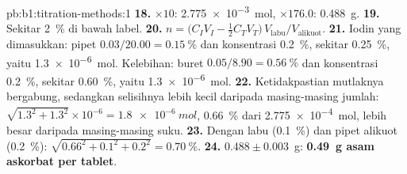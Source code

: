 \begin{solution}{pb:b1:titration-methods:1}
\textbf{18.} $\times 10$: \qty{2.775e-3}{mol}, $\times 176.0$:
\qty{0.488}{g}.
\textbf{19.} Sekitar \qty{2}{\percent} di bawah label.
\textbf{20.} $n = \bigl(C_IV_I - \frac12C_TV_T\bigr)\,V_{\mathrm{labu}}/V_{\mathrm{alikuot}}$.
\textbf{21.} Iodin yang dimasukkan: pipet $0.03/20.00 = \qty{0.15}{\percent}$
dan konsentrasi \qty{0.2}{\percent}, sekitar \qty{0.25}{\percent}, yaitu
\qty{1.3e-6}{mol}. Kelebihan: buret $0.05/8.90 = \qty{0.56}{\percent}$ dan
konsentrasi \qty{0.2}{\percent}, sekitar \qty{0.60}{\percent}, yaitu
\qty{1.3e-6}{mol}.
\textbf{22.} Ketidakpastian mutlaknya bergabung, sedangkan selisihnya
lebih kecil daripada masing-masing jumlah: $\sqrt{1.3^2 + 1.3^2} \times 10^{-6} =
\qty{1.8e-6}{mol}$, \qty{0.66}{\percent} dari \qty{2.775e-4}{mol}, lebih
besar daripada masing-masing suku.
\textbf{23.} Dengan labu (\qty{0.1}{\percent}) dan pipet alikuot
(\qty{0.2}{\percent}): $\sqrt{0.66^2 + 0.1^2 + 0.2^2} = \qty{0.70}{\percent}$.
\textbf{24.} $0.488 \pm 0.003$~g: \textbf{\qty{0.49}{g} asam askorbat
per tablet}.
\end{solution}
